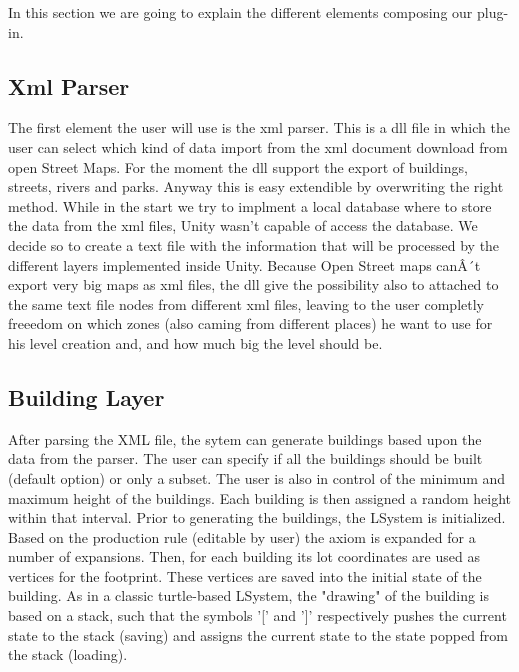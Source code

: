 \documentclass[conference]{IEEEtran}
\begin{document}
In this section we are going to explain the different elements composing our plug-in. 

\subsection{Xml Parser}

The first element the user will use is the xml parser. This is a dll file in which the user can select which kind of data import from the xml document download from open Street Maps. For the moment the dll support the export of buildings, streets, rivers and parks. Anyway this is easy extendible by overwriting the right method. 
While in the start we try to implment a local database where to store the data from the xml files, Unity wasn't capable of access the database. We decide so to create a text file with the information that will be processed by the different layers implemented inside Unity. Because Open Street maps canÂ´t export very big maps as xml files, the dll give the possibility also to attached to the same text file nodes from different xml files, leaving to the user completly freeedom on which zones (also caming from different places) he want to use for his level creation and, and how much big the level should be.

\subsection{Building Layer}
After parsing the XML file, the sytem can generate buildings based upon the data from the parser. The user can specify if all the buildings should be built (default option) or only a subset. The user is also in control of the minimum and maximum height of the buildings. Each building is then assigned a random height within that interval. Prior to generating the buildings, the LSystem is initialized. Based on the production rule (editable by user) the axiom is expanded for a number of expansions. Then, for each building its lot coordinates are used as vertices for the footprint. These vertices are saved into the initial state of the building. As in a classic turtle-based LSystem, the "drawing" of the building is based on a stack, such that the symbols '[' and ']' respectively pushes the current state to the stack (saving) and assigns the current state to the state popped from the stack (loading). \newline
\end{document}
